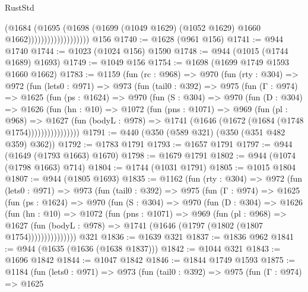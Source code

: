 \begin{lexlean}{RustStd}
\begin{coremodule}
                                  (@1684
                                    (@1695
                                      (@1698
                                        (@1699
                                          (@1049 @1629)
                                          (@1052 @1629)
                                          @1660
                                          @1662)))))))))))))))))))
    @156
@1740 := @1628 (@961 @156)
@1741 := @944 @1740
@1744 := @1023 (@1024 @156) @1590
@1748 := @944 (@1015 (@1744 @1689) @1693)
@1749 := @1049 @156
@1754 := @1698 (@1699 @1749 @1593 @1660 @1662)
@1783 := @1159
    (fun (rc : @968) =>
    @970
      (fun (rty : @304) =>
      @972
        (fun (lets0 : @971) =>
        @973
          (fun (tail0 : @392) =>
          @975
            (fun (Γ : @974) =>
            @1625
              (fun (ps : @1624) =>
              @970
                (fun (S : @304) =>
                @970
                  (fun (D : @304) =>
                  @1626
                    (fun (hn : @10) =>
                    @1072
                      (fun (pns : @1071) =>
                      @969
                        (fun (pl : @968) =>
                        @1627
                          (fun (bodyL : @978) =>
                          @1741 (@1646 (@1672 (@1684 (@1748 @1754))))))))))))))))
@1791 := @440 (@350 (@589 @321) (@350 (@351 @482 @359) @362))
@1792 := @1783 @1791
@1793 := @1657 @1791
@1797 := @944 (@1649 (@1793 @1663) @1670)
@1798 := @1679 @1791
@1802 := @944 (@1074 (@1798 @1663) @714)
@1804 := @1744 (@1031 @1791)
@1805 := @1015 @1804
@1807 := @944 (@1805 @1693)
@1835 := @1162
    (fun (rty : @304) =>
    @972
      (fun (lets0 : @971) =>
      @973
        (fun (tail0 : @392) =>
        @975
          (fun (Γ : @974) =>
          @1625
            (fun (ps : @1624) =>
            @970
              (fun (S : @304) =>
              @970
                (fun (D : @304) =>
                @1626
                  (fun (hn : @10) =>
                  @1072
                    (fun (pns : @1071) =>
                    @969
                      (fun (pl : @968) =>
                      @1627
                        (fun (bodyL : @978) =>
                        @1741 (@1646 (@1797 (@1802 (@1807 @1754)))))))))))))))
    @321
@1836 := @1639 @321
@1837 := @1836 @962
@1841 := @944 (@1635 (@1636 (@1638 @1837)))
@1842 := @1044 @321
@1843 := @1696 @1842
@1844 := @1047 @1842
@1846 := @1844 @1749 @1593
@1875 := @1184
    (fun (lets0 : @971) =>
    @973
      (fun (tail0 : @392) =>
      @975
        (fun (Γ : @974) =>
        @1625

\end{coremodule}
\end{lexlean}
